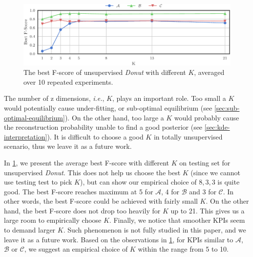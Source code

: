 \documentclass[sigconf]{acmart}
\newcommand{\DONUT}{\textit{Donut}}
\newcommand{\IE}{\textit{i.e.}}
\newcommand{\DATASETA}{$\mathcal{A}$}
\newcommand{\DATASETB}{$\mathcal{B}$}
\newcommand{\DATASETC}{$\mathcal{C}$}
\begin{document}
\begin{figure}
	\centering
	\includegraphics[width=\columnwidth]{z_dim_fscore_000}
	\caption{
		The best F-score of unsupervised \DONUT{} with different $K$, averaged over 10 repeated experiments.
	}
	\label{fig:z-dim-perf}
\end{figure}

The number of z dimensions, \IE, $K$, plays an important role.
Too small a $K$ would potentially cause under-fitting, or sub-optimal equilibrium (see \cref{sec:sub-optimal-equilibrium}).
On the other hand, too large a $K$ would probably cause the reconstruction probability unable to find a good posterior (see \cref{sec:kde-interpretation}).
It is difficult to choose a good $K$ in totally unsupervised scenario, thus we leave it as a future work.

In \cref{fig:z-dim-perf},  we present the average best F-score with different $K$ on testing set for unsupervised \DONUT{}.
This does not help us choose the best $K$ (since we cannot use testing test to pick $K$), but can show our empirical choice of $8,3,3$ is quite good. The best F-score reaches maximum at 5 for \DATASETA{}, 4 for \DATASETB{} and 3 for \DATASETC{}.
In other words, the best F-score could be achieved with fairly small $K$.
On the other hand, the best F-score does not drop too heavily for $K$ up to 21.
This gives us a large room to empirically choose $K$.
Finally, we notice that smoother KPIs seem to demand larger $K$.
Such phenomenon is not fully studied in this paper, and we leave it as a future work.
Based on the observations in \cref{fig:z-dim-perf}, for KPIs similar to \DATASETA{}, \DATASETB{} or \DATASETC{}, we suggest an empirical choice of $K$ within the range from 5 to 10.



\end{document}
